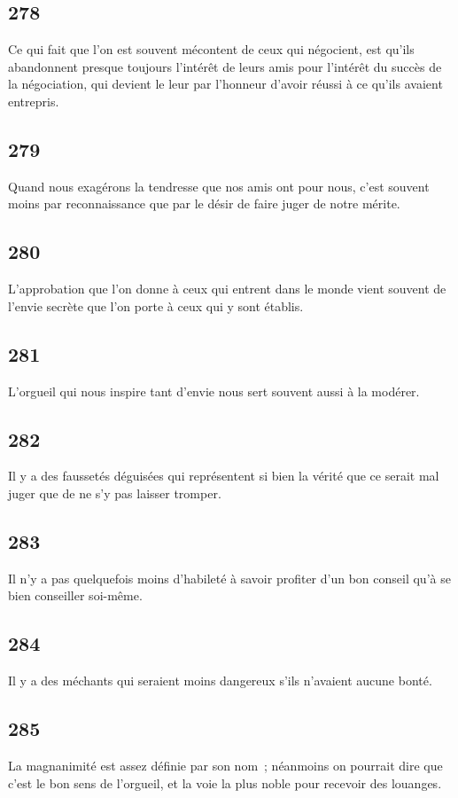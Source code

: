 \documentclass[french,twoside]{book} %
\begin{document}
\subsection[{278}]{ \textsc{278} }
\noindent Ce qui fait que l’on est souvent mécontent de ceux qui négocient, est qu’ils abandonnent presque toujours l’intérêt de leurs amis pour l’intérêt du succès de la négociation, qui devient le leur par l’honneur d’avoir réussi à ce qu’ils avaient entrepris.
\subsection[{279}]{ \textsc{279} }
\noindent Quand nous exagérons la tendresse que nos amis ont pour nous, c’est souvent moins par reconnaissance que par le désir de faire juger de notre mérite.
\subsection[{280}]{ \textsc{280} }
\noindent L’approbation que l’on donne à ceux qui entrent dans le monde vient souvent de l’envie secrète que l’on porte à ceux qui y sont établis.
\subsection[{281}]{ \textsc{281} }
\noindent L’orgueil qui nous inspire tant d’envie nous sert souvent aussi à la modérer.
\subsection[{282}]{ \textsc{282} }
\noindent Il y a des faussetés déguisées qui représentent si bien la vérité que ce serait mal juger que de ne s’y pas laisser tromper.
\subsection[{283}]{ \textsc{283} }
\noindent Il n’y a pas quelquefois moins d’habileté à savoir profiter d’un bon conseil qu’à se bien conseiller soi-même.
\subsection[{284}]{ \textsc{284} }
\noindent Il y a des méchants qui seraient moins dangereux s’ils n’avaient aucune bonté.
\subsection[{285}]{ \textsc{285} }
\noindent La magnanimité est assez définie par son nom ; néanmoins on pourrait dire que c’est le bon sens de l’orgueil, et la voie la plus noble pour recevoir des louanges.
\end{document}
